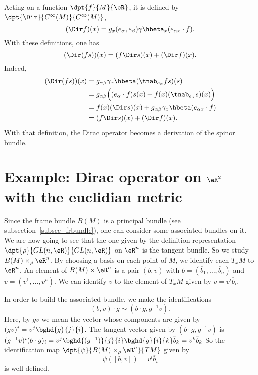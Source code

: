 Acting on a function $\dpt{f}{M}{\eR}$, it is defined by $\dpt{\Dir}{C^{\infty}(M)}{C^{\infty}(M)}$,
\begin{equation} \label{eq_defDirac_f}
	(\Dir f)(x)=g_x(e_{\alpha},e_{\beta})\gamma\hbeta_x(e_{\alpha x}\cdot f).
\end{equation}
With these definitions, one has
\[(\Dir(fs))(x)=(f\Dir s)(x)+(\Dir f)(x).\] Indeed,
\begin{equation}
	\begin{split}
		(\Dir(fs))(x)&=g_{\alpha\beta}\gamma_x\hbeta(\tnab_{e_{\alpha}}fs)(s)\\
		&=g_{\alpha\beta}\Big((e_{\alpha}\cdot f)s(x)+f(x)(\tnab_{e_{\alpha}}s)(x)\Big)\\
		&=f(x)(\Dir s)(x)+g_{\alpha\beta}\gamma_x\hbeta(e_{\alpha x}\cdot f)\\
		&=(f\Dir s)(x)+(\Dir f)(x).
	\end{split}
\end{equation}
With that definition, the Dirac operator becomes a derivation of the spinor bundle.


\section[Dirac operator on  \texorpdfstring{$\eR^2$}{R2}]{Example: Dirac operator on \texorpdfstring{$\eR^2$}{R2} with the euclidian metric}\label{Pg_exempleRdeux}


Since the frame bundle $B(M)$ is a principal bundle (see subsection~\ref{subsec_frbundle}), one can consider some associated bundles on it. We are now going to see that the one given by the definition representation $\dpt{\rho}{GL(n,\eR)}{GL(n,\eR)}$ on $\eR^n$ is the tangent bundle. So we study $B(M)\times_{\rho} \eR^n$. By choosing a basis on each point of $M$, we identify each $T_xM$ to $\eR^n$. An element of $B(M)\times \eR^n$ is a pair $(b,v)$ with $b=(\overline{b}_1,\ldots,\overline{b}_n)$ and $v=(v^1,\ldots,v^n)$. We can identify $v$ to the element of $T_xM$ given by $v=v^i\overline{b}_i$.

In order to build the associated bundle, we make the identifications
\[
	(b,v)\cdot g\sim(b\cdot g,g^{-1} v).
\]
Here, by $gv$ we mean the vector whose components are given by $(gv)^i=v^j\bghd{g}{j}{i}$. The tangent vector given by $(b\cdot g,g^{-1} v)$ is $(g^{-1} v)^i(b\cdot g)_i=v^j\bghd{(g^{-1})}{j}{i}\bghd{g}{i}{k}\overline{b}_k=v^k\overline{b}_k$ So the identification map $\dpt{\psi}{B(M)\times_{\rho}\eR^n}{TM}$ given by
\[
	\psi([b,v])=v^i\overline{b}_i
\]
is well defined.

